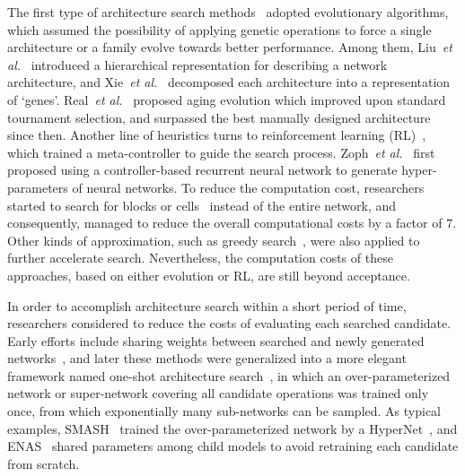\documentclass{article} \usepackage{iclr2020_conference,times}
\begin{document}
The first type of architecture search methods~\citep{liu2017hierarchical,xie2017genetic,real2017large,elsken2018efficient,real2018regularized,miikkulainen2019evolving} adopted evolutionary algorithms, which assumed the possibility of applying genetic operations to force a single architecture or a family evolve towards better performance. Among them, Liu~\textit{et al.}~\citep{liu2017hierarchical} introduced a hierarchical representation for describing a network architecture, and Xie~\textit{et al.}~\citep{xie2017genetic} decomposed each architecture into a representation of `genes'. Real~\textit{et al.}~\citep{real2018regularized} proposed aging evolution which improved upon standard tournament selection, and surpassed the best manually designed architecture since then. Another line of heuristics turns to reinforcement learning (RL)~\citep{zoph2016neural,baker2016designing,zoph2018learning,zhong2018practical,liu2018progressive}, which trained a meta-controller to guide the search process. Zoph~\textit{et al.}~\citep{zoph2016neural} first proposed using a controller-based recurrent neural network to generate hyper-parameters of neural networks. To reduce the computation cost, researchers started to search for blocks or cells~\citep{zhong2018practical,zoph2018learning} instead of the entire network, and consequently, managed to reduce the overall computational costs by a factor of $7$. Other kinds of approximation, such as greedy search~\citep{liu2018progressive}, were also applied to further accelerate search. Nevertheless, the computation costs of these approaches, based on either evolution or RL, are still beyond acceptance.

In order to accomplish architecture search within a short period of time, researchers considered to reduce the costs of evaluating each searched candidate. Early efforts include sharing weights between searched and newly generated networks~\citep{cai2018efficient}, and later these methods were generalized into a more elegant framework named one-shot architecture search~\citep{brock2017smash,cai2018proxylessnas,liu2018darts,pham2018efficient,xie2018snas}, in which an over-parameterized network or super-network covering all candidate operations was trained only once, from which exponentially many sub-networks can be sampled. As typical examples, SMASH~\citep{brock2017smash} trained the over-parameterized network by a HyperNet~\citep{ha2016hypernetworks}, and ENAS~\citep{pham2018efficient} shared parameters among child models to avoid retraining each candidate from scratch.
\end{document}
